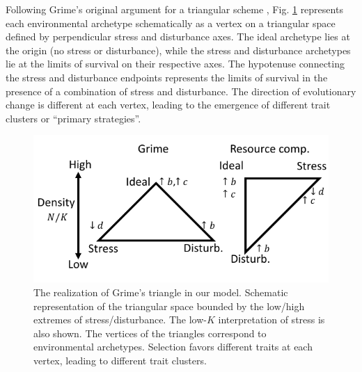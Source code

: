 \documentclass[11pt]{article}
\begin{document}
Following Grime's original argument for a triangular scheme \citep{grime_1977}, Fig. \ref{fig:axes} represents each environmental archetype schematically as a vertex on a triangular space defined by perpendicular stress and disturbance axes. The ideal archetype lies at the origin (no stress or disturbance), while the stress and disturbance archetypes lie at the limits of survival on their respective axes. The hypotenuse connecting the stress and disturbance endpoints represents the limits of survival in the presence of a combination of stress and disturbance. The direction of evolutionary change is different at each vertex, leading to the emergence of different trait clusters or ``primary strategies''. 

\begin{figure}
\centering
\includegraphics[scale=1]{axes.pdf}
\caption{\label{fig:axes} The realization of Grime's triangle in our model. Schematic representation of the triangular space bounded by the low/high extremes of stress/disturbance. The low-$K$ interpretation of stress is also shown. The vertices of the triangles correspond to environmental archetypes. Selection favors different traits at each vertex, leading to different trait clusters.} 
\end{figure}
\end{document}
